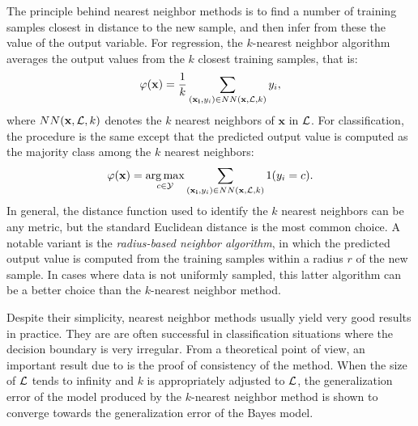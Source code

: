The principle behind nearest neighbor methods is to find a number of
training samples closest in distance to the new sample, and then infer from
these the value of the output variable. For regression, the $k$-nearest
neighbor algorithm~\citep{fix:1951} averages the output values from the $k$
closest training samples, that is:
\begin{equation}
\varphi(\mathbf{x}) = \frac{1}{k} \sum_{(\mathbf{x_i}, y_i) \in NN(\mathbf{x}, {\cal L}, k)} y_i,
\end{equation}
where $NN(\mathbf{x}, {\cal L}, k)$ denotes the $k$ nearest neighbors of ${\mathbf{x}}$ in ${\cal L}$.
For classification, the procedure is the same except that the predicted
output value is computed as the majority class among the $k$ nearest neighbors:
\begin{equation}
\varphi(\mathbf{x}) = \operatorname*{arg\,max}_{c \in {\cal Y}} \sum_{(\mathbf{x_i}, y_i) \in NN(\mathbf{x}, {\cal L}, k)} 1(y_i = c).
\end{equation}
In general, the distance function used to identify the $k$ nearest neighbors
can be any metric, but the standard Euclidean distance is the most common
choice. A notable variant is the
\textit{radius-based neighbor algorithm}, in which the predicted output value
is computed from the training samples within a radius $r$ of the new sample.
In cases where data is not uniformly sampled, this latter algorithm can be
a better choice than the $k$-nearest neighbor method.

Despite their simplicity, nearest neighbor methods usually yield very good
results in practice. They are are often successful in classification situations
where the decision boundary is very irregular. From a theoretical point of
view, an important result due to \citet{cover:1967} is the proof of consistency
of the method. When the size of ${\cal L}$ tends to infinity and $k$ is
appropriately adjusted to ${\cal L}$, the generalization error of the model
produced by the $k$-nearest neighbor method is shown to converge towards the
generalization error of the Bayes model.
